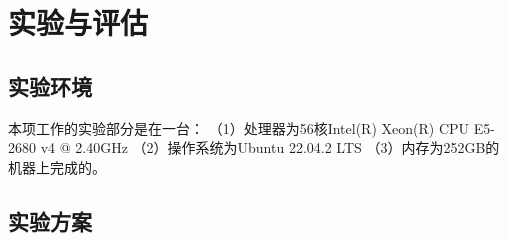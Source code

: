 
\cleardoublepage
\section{实验与评估}        %
\subsection{实验环境}
本项工作的实验部分是在一台：
（1）处理器为56核Intel(R) Xeon(R) CPU E5-2680 v4 @ 2.40GHz
（2）操作系统为Ubuntu 22.04.2 LTS
（3）内存为252GB的机器上完成的。
\subsection{实验方案}
